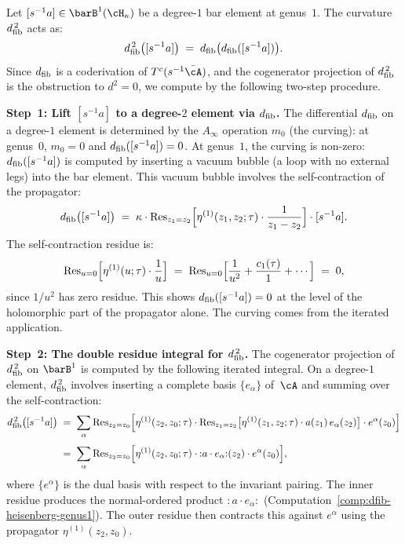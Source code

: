 \begin{computation}
\label{comp:dfib-sq-heisenberg-genus1}

Let $[s^{-1}a] \in \barB^1(\cH_\kappa)$ be a degree-$1$ bar
element at genus~$1$. The curvature $d_{\mathrm{fib}}^{\,2}$ acts as:
\begin{equation}\label{eq:dfib-sq-degree-1}
 d_{\mathrm{fib}}^{\,2}\bigl([s^{-1}a]\bigr)
 \;=\;
 d_{\mathrm{fib}}\bigl(d_{\mathrm{fib}}([s^{-1}a])\bigr).
\end{equation}
Since $d_{\mathrm{fib}}$ is a coderivation of $T^c(s^{-1}\bar\cA)$, and the
cogenerator projection of $d_{\mathrm{fib}}^{\,2}$ is the obstruction to
$d^2 = 0$, we compute by the following two-step procedure.

\smallskip\noindent
\textbf{Step~1: Lift $[s^{-1}a]$ to a degree-$2$ element via $d_{\mathrm{fib}}$.}
The differential $d_{\mathrm{fib}}$ on a degree-$1$ element is determined by
the $A_\infty$ operation $m_0$ (the curving): at genus~$0$,
$m_0 = 0$ and $d_{\mathrm{fib}}([s^{-1}a]) = 0$. At genus~$1$, the
curving is non-zero: $d_{\mathrm{fib}}([s^{-1}a])$ is computed by inserting
a vacuum bubble (a loop with no external legs) into the bar element.
This vacuum bubble involves the self-contraction of the propagator:
\begin{equation}\label{eq:vacuum-bubble}
 d_{\mathrm{fib}}\bigl([s^{-1}a]\bigr)
 \;=\;
 \kappa \cdot
 \operatorname{Res}_{z_1=z_2}\Bigl[
 \eta^{(1)}(z_1,z_2;\tau) \cdot \frac{1}{z_1 - z_2}
 \Bigr]
 \cdot [s^{-1}a].
\end{equation}
The self-contraction residue is:
\[
 \operatorname{Res}_{u=0}\Bigl[\eta^{(1)}(u;\tau) \cdot \frac{1}{u}\Bigr]
 \;=\;
 \operatorname{Res}_{u=0}\Bigl[\frac{1}{u^2} + \frac{c_1(\tau)}{1} + \cdots\Bigr]
 \;=\; 0,
\]
since $1/u^2$ has zero residue. This shows $d_{\mathrm{fib}}([s^{-1}a]) = 0$
at the level of the holomorphic part of the propagator alone.
The curving comes from the iterated application.

\smallskip\noindent
\textbf{Step~2: The double residue integral for $d_{\mathrm{fib}}^{\,2}$.}
The cogenerator projection of $d_{\mathrm{fib}}^{\,2}$ on $\barB^1$ is
computed by the following iterated integral. On a degree-$1$
element, $d_{\mathrm{fib}}^{\,2}$ involves inserting a complete basis
$\{e_\alpha\}$ of~$\cA$ and summing over the
self-contraction:
\begin{align}\label{eq:dfib-sq-double-integral}
 d_{\mathrm{fib}}^{\,2}\bigl([s^{-1}a]\bigr)
 &\;=\;
 \sum_\alpha
 \operatorname{Res}_{z_2=z_0}\Bigl[
 \eta^{(1)}(z_2,z_0;\tau) \cdot
 \operatorname{Res}_{z_1=z_2}\bigl[
 \eta^{(1)}(z_1,z_2;\tau) \cdot
 a(z_1)\, e_\alpha(z_2)
 \bigr]
 \cdot e^\alpha(z_0)
 \Bigr]
 \notag\\[3pt]
 &\;=\;
 \sum_\alpha
 \operatorname{Res}_{z_2=z_0}\Bigl[
 \eta^{(1)}(z_2,z_0;\tau) \cdot
 {:}a \cdot e_\alpha{:}(z_2) \cdot e^\alpha(z_0)
 \Bigr],
\end{align}
where $\{e^\alpha\}$ is the dual basis with respect to the invariant
pairing. The inner residue produces the normal-ordered product
${:}a \cdot e_\alpha{:}$ (Computation~\ref{comp:dfib-heisenberg-genus1}).
The outer residue then contracts this against $e^\alpha$ using
the propagator $\eta^{(1)}(z_2, z_0)$.


\end{computation}
